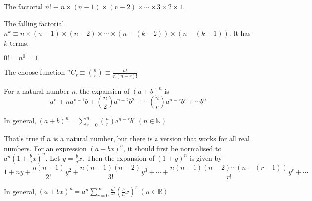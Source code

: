 \documentclass[../main.tex]{subfile}
\begin{document}


\vspace{-0.8em}
\begin{center}
The factorial $n! \equiv n \times (n - 1) \times (n - 2) \times \cdots \times 3 \times 2 \times 1$.

The falling factorial $n^{\underline{k}} \equiv n \times (n - 1) \times (n - 2) \times \cdots \times (n - (k - 2)) \times (n - (k - 1))$. It has $k$ terms.

$\boxed{0! = n^{\underline{0}} = 1}$

The choose function $\displaystyle ^n C_r \equiv \boxed{\binom{n}{r} \equiv \frac{n!}{r! (n - r)!}}$
\end{center}


\vspace{-0.8em}
\begin{center}
For a natural number $n$, the expansion of $(a + b)^n$ is $$a^n + n a^{n - 1} b + \binom{n}{2} a^{n - 2} b^2 + \cdots \binom{n}{r} a^{n - r} b^r + \cdots b^n$$

In general, $\boxed{\displaystyle (a + b)^n = \sum_{r = 0}^n \binom{n}{r} a^{n - r} b^r\ (n \in \mathbb{N})}$

That's true if $n$ is a natural number, but there is a version that works for all real numbers. For an expression $(a + bx)^n$, it should first be normalised to $a^n (1 + \frac{b}{a} x)^n$. Let $y = \frac{b}{a} x$. Then the expansion of $(1 + y)^n$ is given by $$1 + ny + \frac{n (n - 1)}{2!} y^2 + \frac{n (n - 1) (n - 2)}{3!} y^3 + \cdots + \frac{n (n - 1) (n - 2) \cdots (n - (r - 1))}{r!} y^r + \cdots$$

In general, $\boxed{\displaystyle (a + bx)^n = a^n \sum_{r = 0}^\infty \frac{n^{\underline{r}}}{r!} \left(\frac{b}{a} x\right)^r\ (n \in \mathbb{R})}$
\end{center}
\end{document}
